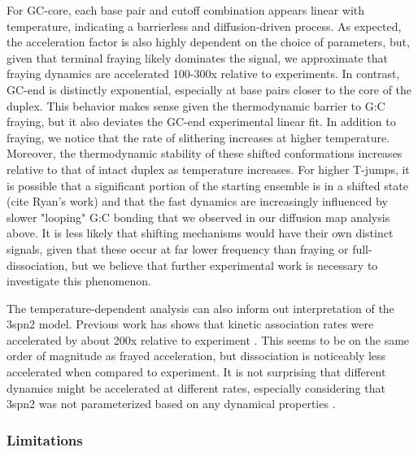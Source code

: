 \documentclass[journal=jpcbfk,manuscript=article]{achemso}
\begin{document}
For GC-core, each base pair and cutoff combination appears linear with temperature, indicating a barrierless and diffusion-driven process. As expected, the acceleration factor is also highly dependent on the choice of parameters, but, given that terminal fraying likely dominates the signal, we approximate that fraying dynamics are accelerated 100-300x relative to experiments. In contrast, GC-end is distinctly exponential, especially at base pairs closer to the core of the duplex. This behavior makes sense given the thermodynamic barrier to G:C fraying, but it also deviates the GC-end experimental linear fit. In addition to fraying, we notice that the rate of slithering increases at higher temperature. Moreover, the thermodynamic stability of these shifted conformations increases relative to that of intact duplex as temperature increases. For higher T-jumps, it is possible that a significant portion of the starting ensemble is in a shifted state (cite Ryan's work) and that the fast dynamics are increasingly influenced by slower "looping" G:C bonding that we observed in our diffusion map analysis above. It is less likely that shifting mechanisms would have their own distinct signals, given that these occur at far lower frequency than fraying or full-dissociation, but we believe that further experimental work is necessary to investigate this phenomenon.

The temperature-dependent analysis can also inform out interpretation of the 3spn2 model. Previous work has shows that kinetic association rates were accelerated by about 200x relative to experiment \citep{Hinckley2013AnHybridization}. This seems to be on the same order of magnitude as frayed acceleration, but dissociation is noticeably less accelerated when compared to experiment. It is not surprising that different dynamics might be accelerated at different rates, especially considering that 3spn2 was not parameterized based on any dynamical properties \citep{?}. 


\subsubsection{\label{sec:Results}Limitations} 
\end{document}
